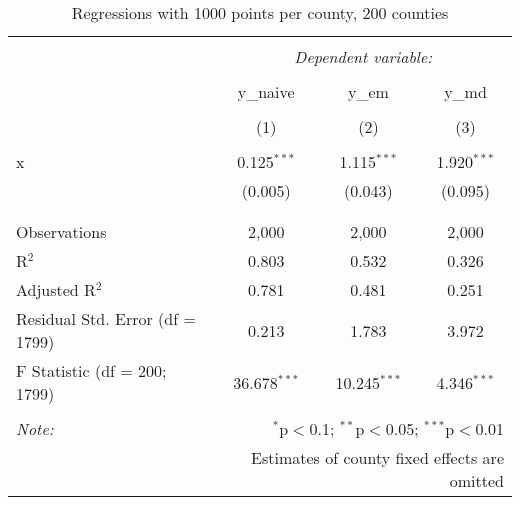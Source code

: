 
\begin{table}[!htbp] \centering 
  \caption{Regressions with 1000 points per county, 200 counties} 
  \label{} 
\begin{tabular}{@{\extracolsep{5pt}}lccc} 
\\[-1.8ex]\hline 
\hline \\[-1.8ex] 
 & \multicolumn{3}{c}{\textit{Dependent variable:}} \\ 
\cline{2-4} 
\\[-1.8ex] & y\_naive & y\_em & y\_md \\ 
\\[-1.8ex] & (1) & (2) & (3)\\ 
\hline \\[-1.8ex] 
 x & 0.125$^{***}$ & 1.115$^{***}$ & 1.920$^{***}$ \\ 
  & (0.005) & (0.043) & (0.095) \\ 
  & & & \\ 
\hline \\[-1.8ex] 
Observations & 2,000 & 2,000 & 2,000 \\ 
R$^{2}$ & 0.803 & 0.532 & 0.326 \\ 
Adjusted R$^{2}$ & 0.781 & 0.481 & 0.251 \\ 
Residual Std. Error (df = 1799) & 0.213 & 1.783 & 3.972 \\ 
F Statistic (df = 200; 1799) & 36.678$^{***}$ & 10.245$^{***}$ & 4.346$^{***}$ \\ 
\hline 
\hline \\[-1.8ex] 
\textit{Note:}  & \multicolumn{3}{r}{$^{*}$p$<$0.1; $^{**}$p$<$0.05; $^{***}$p$<$0.01} \\ 
 & \multicolumn{3}{r}{Estimates of county fixed effects are omitted} \\ 
\end{tabular} 
\end{table} 
